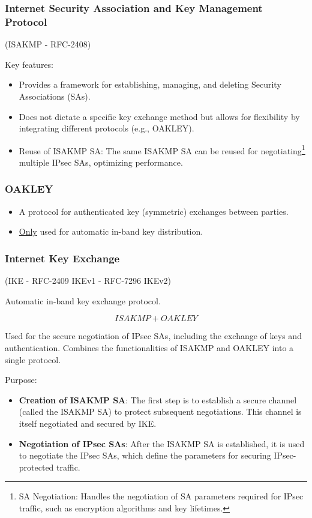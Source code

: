 \subsubsection{Internet Security Association and Key Management Protocol}
\begin{center}
    (ISAKMP - RFC-2408)
\end{center}

Key features:
\begin{itemize}
    \item Provides a framework for establishing, managing, and deleting Security Associations (SAs).
    \item Does not dictate a specific key exchange method but allows for flexibility by integrating different protocols (e.g., OAKLEY).
    \item Reuse of ISAKMP SA: The same ISAKMP SA can be reused for negotiating\footnote{SA Negotiation: Handles the negotiation of SA parameters required for IPsec traffic, such as encryption algorithms and key lifetimes.} multiple IPsec SAs, optimizing performance.
\end{itemize}
\subsubsection{OAKLEY}
\begin{itemize}
    \item A protocol for authenticated key (symmetric) exchanges between parties.
    \item \underline{Only} used for automatic in-band key distribution.
\end{itemize}

\subsubsection{Internet Key Exchange}
\begin{center}
    (IKE - RFC-2409 IKEv1 - RFC-7296 IKEv2)

    Automatic in-band key exchange protocol.
\end{center}
\[
ISAKMP + OAKLEY
\]

Used for the secure negotiation of IPsec SAs, including the exchange of keys and authentication. Combines the functionalities of ISAKMP and OAKLEY into a single protocol.

Purpose:
\begin{itemize}
\item \textbf{Creation of ISAKMP SA}: The first step is to establish a secure channel (called the ISAKMP SA) to protect subsequent negotiations. This channel is itself negotiated and secured by IKE.
\item \textbf{Negotiation of IPsec SAs}: After the ISAKMP SA is established, it is used to negotiate the IPsec SAs, which define the parameters for securing IPsec-protected traffic.
\end{itemize}

